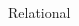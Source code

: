 \documentclass[a4paper]{article}
\begin{document}
\begin{multicols*}{2}
\begin{footnotesize}
\ Relational 
\end{footnotesize}
\end{multicols*}
\end{document}
